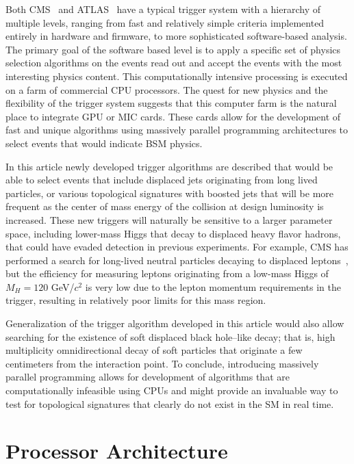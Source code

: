 \documentclass[preprint,sort&compress]{elsarticle}
\begin{document}
Both CMS~\cite{Chatrchyan:2008aa} and ATLAS~\cite{Aad:2008zzm} have a typical trigger system with a hierarchy of multiple levels, 
ranging from fast and relatively simple criteria implemented entirely in hardware and firmware, to more sophisticated software-based analysis. 
The primary goal of the software based level is to apply a specific set of 
physics selection algorithms on the events read out and accept the events with the most interesting physics 
content. This computationally intensive processing is executed on a farm of commercial CPU processors.
The quest for new physics and the flexibility of the trigger system suggests that this computer farm is the natural
place to integrate GPU or MIC cards. These cards allow for the development of fast and unique algorithms using massively
 parallel programming architectures to select events that would indicate BSM physics. 

In this article newly developed trigger algorithms are described that would be able to select events that
include displaced jets originating from long lived particles, or various topological signatures with boosted
jets that will be more frequent as the center of mass energy of the collision at design luminosity is
increased. These new triggers will naturally be sensitive to a larger parameter space, including lower-mass
Higgs that decay to displaced heavy flavor hadrons, that could have evaded detection in previous
experiments. For example, CMS has performed a search for long-lived neutral particles decaying to displaced
leptons~\cite{Chatrchyan:2012jna}, but the efficiency for measuring leptons originating from a low-mass Higgs
of $M_H = 120$ GeV/$c^2$ is very low due to the lepton momentum requirements in the trigger, resulting in
relatively poor limits for this mass region.

Generalization of the trigger algorithm developed in this article would also allow searching for 
the existence of soft displaced black hole--like decay; that is, high multiplicity omnidirectional decay of soft particles  
that originate a few centimeters from the interaction point. To conclude, introducing massively parallel programming
allows for development of algorithms that are computationally infeasible using CPUs and
might provide an invaluable way to test for topological signatures that clearly do not exist in the SM in real time.



\section{Processor Architecture}
\end{document}
